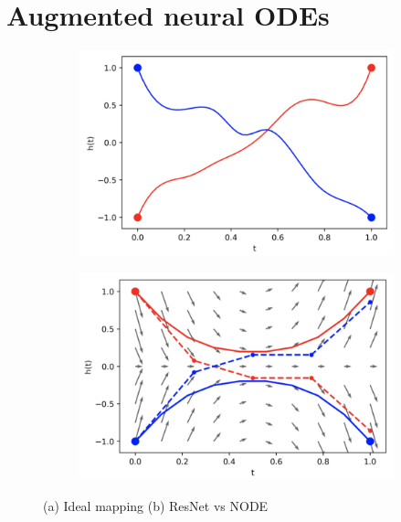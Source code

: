 \documentclass{article}
\begin{document}
	\section{Augmented neural ODEs}
		\begin{figure}
		\centering	
		\begin{subfigure}{.49\textwidth}
			\includegraphics[width=1\linewidth]{images/anode-a}
			\caption{}
		\end{subfigure}
		\centering
		\begin{subfigure}{.49\textwidth}
			\includegraphics[width=1\linewidth]{images/anode-b}
			\caption{}
		\end{subfigure}
		\caption{(a) Ideal mapping (b) ResNet vs NODE}
		\label{fig:anodea}
	\end{figure}
\end{document}
